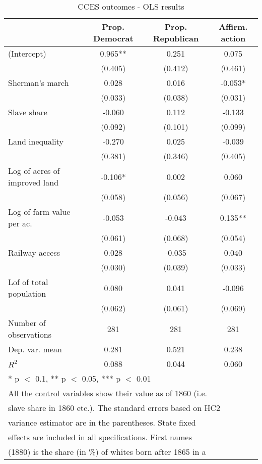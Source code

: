 \begin{table}

\caption{\label{tab:}CCES outcomes - OLS results}
\centering
\begin{tabular}[t]{lccc}
\toprule
  & Prop. Democrat & Prop. Republican & Affirm. action\\
\midrule
(Intercept) & 0.965** & 0.251 & 0.075\\
 & (0.405) & (0.412) & (0.461)\\
Sherman's march & 0.028 & 0.016 & -0.053*\\
 & (0.033) & (0.038) & (0.031)\\
Slave share & -0.060 & 0.112 & -0.133\\
 & (0.092) & (0.101) & (0.099)\\
Land inequality & -0.270 & 0.025 & -0.039\\
 & (0.381) & (0.346) & (0.405)\\
Log of acres of improved land & -0.106* & 0.002 & 0.060\\
 & (0.058) & (0.056) & (0.067)\\
Log of farm value per ac. & -0.053 & -0.043 & 0.135**\\
 & (0.061) & (0.068) & (0.054)\\
Railway access & 0.028 & -0.035 & 0.040\\
 & (0.030) & (0.039) & (0.033)\\
Lof of total population & 0.080 & 0.041 & -0.096\\
 & (0.062) & (0.061) & (0.069)\\
\midrule
Number of observations & 281 & 281 & 281\\
Dep. var. mean & 0.281 & 0.521 & 0.238\\
$R^2$ & 0.088 & 0.044 & 0.060\\
\bottomrule
\multicolumn{4}{l}{\textsuperscript{} * p $<$ 0.1, ** p $<$ 0.05, *** p $<$ 0.01}\\
\multicolumn{4}{l}{\textsuperscript{} All the control variables show their value as of 1860 (i.e.}\\
\multicolumn{4}{l}{slave share in 1860 etc.). The standard errors based on HC2}\\
\multicolumn{4}{l}{variance estimator are in the parentheses. State fixed}\\
\multicolumn{4}{l}{effects are included in all specifications. First names}\\
\multicolumn{4}{l}{(1880) is the share (in \%) of whites born after 1865 in a}\\

\end{tabular}
\end{table}
